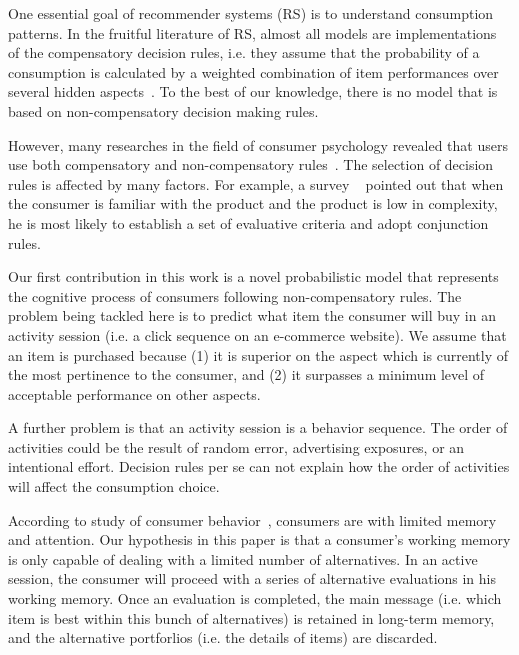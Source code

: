 \documentclass[sigconf]{acmart}
\begin{document}
One essential goal of recommender systems (RS) is to understand consumption patterns. In the fruitful literature of RS, almost all models are implementations of the compensatory decision rules, i.e. they assume that the probability of a consumption is calculated by a weighted combination of item performances over several hidden aspects~\cite{Hu2008Collaborative,Gopalan2015Scalable}. To the best of our knowledge, there is no model that is based on non-compensatory decision making rules.


However, many researches in the field of consumer psychology revealed that users use both compensatory and non-compensatory rules~\cite{Engel1986Consumer}. The selection of decision rules is affected by many factors. For example, a survey ~\cite{Park1976Effect} pointed out that when the consumer is familiar with the product and the product is low in complexity, he is most likely to establish a set of evaluative criteria and adopt conjunction rules.




Our first contribution in this work is a novel probabilistic model that represents the cognitive process of consumers following non-compensatory rules. The problem being tackled here is to predict what item the consumer will buy in an activity session (i.e. a click sequence on an e-commerce website). We assume that an item is purchased because (1) it is superior on the aspect which is currently of the most pertinence to the consumer, and (2) it surpasses a minimum level of acceptable performance on other aspects.


A further problem is that an activity session is a behavior sequence. The order of activities could be the result of random error,  advertising exposures, or an intentional effort. Decision rules per se can not explain how the order of activities will affect the consumption choice.


According to study of consumer behavior~\cite{Engel1986Consumer}, consumers are with limited memory and attention. Our hypothesis in this paper is that a consumer's working memory is only capable of dealing with a limited number of alternatives. In an active session, the consumer will proceed with a series of alternative evaluations in his working memory. Once an evaluation is completed, the main message (i.e. which item is best within this bunch of alternatives) is retained in long-term memory, and the alternative portforlios (i.e. the details of items) are discarded.
\end{document}
